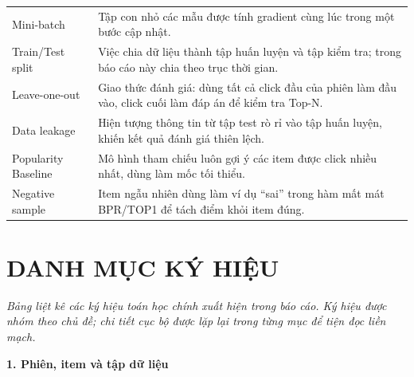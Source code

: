 \documentclass[12pt, a4paper]{article}
\begin{document}
\begin{longtable}{@{}p{4.2cm} p{11cm}@{}}
Mini-batch               & Tập con nhỏ các mẫu được tính gradient cùng lúc trong một bước cập nhật. \\
Train/Test split         & Việc chia dữ liệu thành tập huấn luyện và tập kiểm tra; trong báo cáo này chia theo trục thời gian. \\
Leave-one-out            & Giao thức đánh giá: dùng tất cả click đầu của phiên làm đầu vào, click cuối làm đáp án để kiểm tra Top-N. \\
Data leakage             & Hiện tượng thông tin từ tập test rò rỉ vào tập huấn luyện, khiến kết quả đánh giá thiên lệch. \\
Popularity Baseline      & Mô hình tham chiếu luôn gợi ý các item được click nhiều nhất, dùng làm mốc tối thiểu. \\
Negative sample          & Item ngẫu nhiên dùng làm ví dụ ``sai'' trong hàm mất mát BPR/TOP1 để tách điểm khỏi item đúng. \\

\end{longtable}

\newpage
{}
{}
\section*{DANH MỤC KÝ HIỆU}

\textit{Bảng liệt kê các ký hiệu toán học chính xuất hiện trong báo cáo. Ký hiệu được nhóm theo chủ đề; chi tiết cục bộ được lặp lại trong từng mục để tiện đọc liền mạch.}

\vspace{0.4cm}

\textbf{1. Phiên, item và tập dữ liệu}
\end{document}
